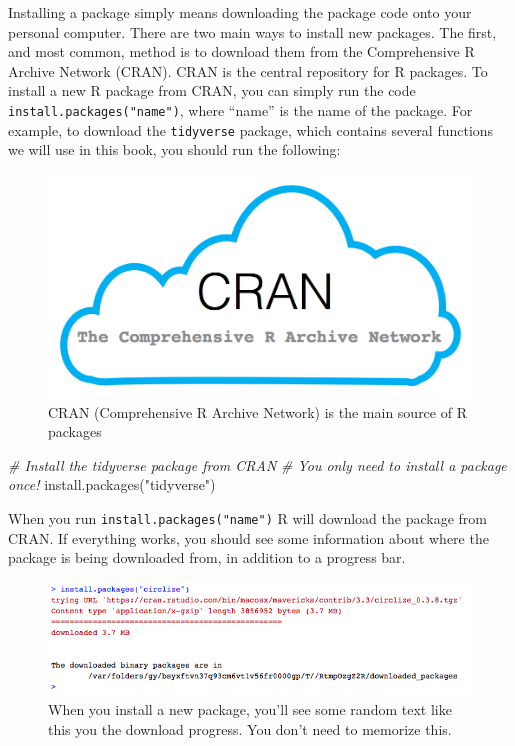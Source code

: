 \documentclass[
]{book}
\newenvironment{Shaded}{\begin{snugshade}}{\end{snugshade}}
\newcommand{\CommentTok}[1]{\textcolor[rgb]{0.56,0.35,0.01}{\textit{#1}}}
\newcommand{\FunctionTok}[1]{\textcolor[rgb]{0.00,0.00,0.00}{#1}}
\newcommand{\NormalTok}[1]{#1}
\newcommand{\StringTok}[1]{\textcolor[rgb]{0.31,0.60,0.02}{#1}}
\begin{document}
Installing a package simply means downloading the package code onto your personal computer. There are two main ways to install new packages. The first, and most common, method is to download them from the Comprehensive R Archive Network (CRAN). CRAN is the central repository for R packages. To install a new R package from CRAN, you can simply run the code \texttt{install.packages("name")}, where ``name'' is the name of the package. For example, to download the \texttt{tidyverse} package, which contains several functions we will use in this book, you should run the following:

\begin{figure}

{\centering \includegraphics[width=0.5\linewidth]{images/chapter-3/cran} 

}

\caption{CRAN (Comprehensive R Archive Network) is the main source of R packages}\label{fig:cran}
\end{figure}

\begin{Shaded}
\begin{Highlighting}[]
\CommentTok{\# Install the tidyverse package from CRAN}
\CommentTok{\#   You only need to install a package once!}
\FunctionTok{install.packages}\NormalTok{(}\StringTok{"tidyverse"}\NormalTok{)}
\end{Highlighting}
\end{Shaded}

When you run \texttt{install.packages("name")} R will download the package from CRAN. If everything works, you should see some information about where the package is being downloaded from, in addition to a progress bar.

\begin{figure}

{\centering \includegraphics[width=0.75\linewidth]{images/chapter-3/installingpackages} 

}

\caption{When you install a new package, you'll see some random text like this you the download progress. You don't need to memorize this.}\label{fig:installingpackages}
\end{figure}
\end{document}
